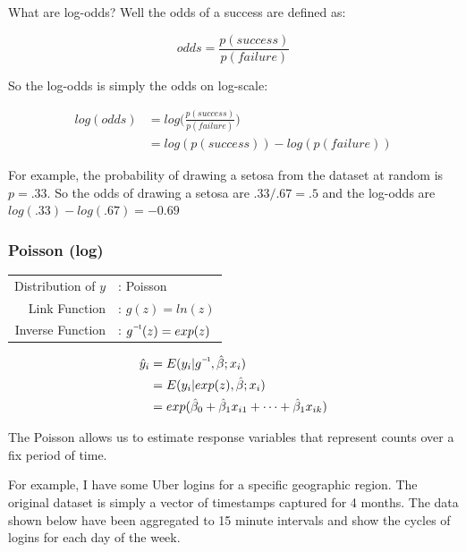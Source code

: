 \documentclass[10pt]{article}\usepackage[]{graphicx}\usepackage[]{color}
\newcommand\inv[1]{#1\raisebox{1.15ex}{$\scriptscriptstyle-\!1$}}
\begin{document}
What are log-odds? Well the odds of a success are defined as: 

$$odds = \frac{p(success)}{p(failure)}$$ 

So the log-odds is simply the odds on log-scale: 

\begin{align}
  log(odds) &= log\bigg(\frac{p(success)}{p(failure)}\bigg) \\
            &= log(p(success)) - log(p(failure))
\end{align}

For example, the probability of drawing a setosa from the dataset at random is $p=.33$. So the odds of drawing a setosa are $.33/.67=.5$ and the log-odds are $log(.33)-log(.67)=-0.69$

\subsubsection*{Poisson (log)}

\begin{tabularx}{\textwidth}{r@{}l@{}}
  { Distribution of $y$ } &: Poisson \\
  { Link Function } &: $g(z)=ln(z)$ \\
  { Inverse Function } &: $\inv{g}(z)= exp(z) $ \\
\end{tabularx}

\begin{align}
  \hat{y}_i &= E(y_i|\inv{g},\hat{\beta};x_i) \\
  &= E(y_i|exp(z),\hat{\beta};x_i) \\
  &= exp(\hat{\beta}_0 + \hat{\beta}_1 x_{i1} + \cdots + \hat{\beta}_1 x_{ik})
\end{align}

The Poisson allows us to estimate response variables that represent counts over a fix period of time. 

For example, I have some Uber logins for a specific geographic region. The original dataset is simply a vector of timestamps captured for 4 months. The data shown below have been aggregated to 15 minute intervals and show the cycles of logins for each day of the week.
\end{document}
